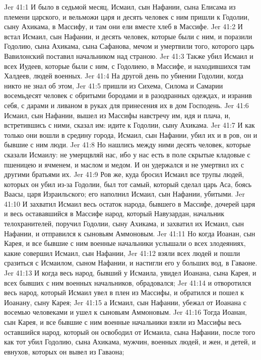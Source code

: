\vs Jer 41:1 И было в седьмой месяц, Исмаил, сын Нафании, сына Елисама из племени царского, и вельможи царя и десять человек с ним пришли к Годолии, сыну Ахикама, в Массифу, и там они ели вместе хлеб в Массифе.
\vs Jer 41:2 И встал Исмаил, сын Нафании, и десять человек, которые были с ним, и поразили Годолию, сына Ахикама, сына Сафанова, мечом и умертвили того, которого царь Вавилонский поставил начальником над страною.
\vs Jer 41:3 Также убил Исмаил и всех Иудеев, которые были с ним, с Годолиею, в Массифе, и находившихся там Халдеев, людей военных.
\vs Jer 41:4 На другой день по убиении Годолии, когда никто не знал об этом,
\vs Jer 41:5 пришли из Сихема, Силома и Самарии восемьдесят человек с обритыми бородами и в разодранных одеждах, и изранив себя, с дарами и ливаном в руках для принесения их в дом Господень.
\vs Jer 41:6 Исмаил, сын Нафании, вышел из Массифы навстречу им, идя и плача, и, встретившись с ними, сказал им: идите к Годолии, сыну Ахикама.
\vs Jer 41:7 И как только они вошли в средину города, Исмаил, сын Нафании, убил их и  в ров, он и бывшие с ним люди.
\vs Jer 41:8 Но нашлись между ними десять человек, которые сказали Исмаилу: не умерщвляй нас, ибо у нас есть в поле скрытые кладовые с пшеницею и ячменем, и маслом и медом. И он удержался и не умертвил их с другими братьями их.
\vs Jer 41:9 Ров же, куда бросил Исмаил все трупы людей, которых он убил из-за Годолии, был тот самый, который сделал царь Аса, боясь Ваасы, царя Израильского; его наполнил Исмаил, сын Нафании, убитыми.
\vs Jer 41:10 И захватил Исмаил весь остаток народа, бывшего в Массифе, дочерей царя и весь остававшийся в Массифе народ, который Навузардан, начальник телохранителей, поручил Годолии, сыну Ахикама, и захватил их Исмаил, сын Нафании, и отправился к сыновьям Аммоновым.
\vs Jer 41:11 Но когда Иоанан, сын Карея, и все бывшие с ним военные начальники услышали о всех злодеяниях, какие совершил Исмаил, сын Нафании,
\vs Jer 41:12 взяли всех людей и пошли сразиться с Исмаилом, сыном Нафании, и настигли его у больших вод, в Гаваоне.
\vs Jer 41:13 И когда весь народ, бывший у Исмаила, увидел Иоанана, сына Карея, и всех бывших с ним военных начальников, обрадовался;
\vs Jer 41:14 и отворотился весь народ, который Исмаил увел в плен из Массифы, и обратился и пошел к Иоанану, сыну Карея;
\vs Jer 41:15 а Исмаил, сын Нафании, убежал от Иоанана с восемью человеками и ушел к сыновьям Аммоновым.
\vs Jer 41:16 Тогда Иоанан, сын Карея, и все бывшие с ним военные начальники взяли из Массифы весь оставшийся народ, который он освободил от Исмаила, сына Нафании, после того как тот убил Годолию, сына Ахикама, мужчин, военных людей, и жен, и детей, и евнухов, которых он вывел из Гаваона;
